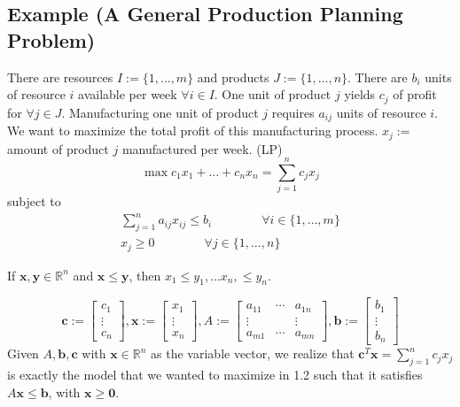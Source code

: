 \subsection{Example (A General Production Planning Problem)}
There are resources $I:=\{1,\dots,m\}$ and products $J:=\{1,\dots,n\}$. 
There are $b_i$ units of resource
$i$ available per week $\forall i\in I$. One unit of product $j$ yields $c_j$ of profit for
$\forall j\in J$. Manufacturing one unit of product $j$ requires $a_{ij}$ units of resource $i$.
We want to maximize the total profit of this manufacturing process.
$x_j :=$ amount of product $j$ manufactured per week. (LP)
\[\max c_1x_1 + \dots + c_nx_n = \sum\limits_{j=1}^n c_jx_j\]
subject to
\begin{align*}
    \sum\limits_{j=1}^n a_{ij}x_{ij}\le b_i \qquad\qquad\forall i\in\{1,\dots,m\}\\
    x_{j}\ge 0 \qquad\qquad\forall j\in\{1,\dots,n\}
\end{align*}

\begin{remark}
    If $\mathbf{x},\mathbf{y}\in\mathbb{R}^n$ and $\mathbf{x}\le \mathbf{y}$, then
    $x_1\le y_1, \dots x_n, \le y_n$.
\end{remark}

\begin{remark}
\[
\mathbf{c}:=\left[\begin{array}{c}{c_{1}} \\ {\vdots} \\ {c_{n}}\end{array}\right],
\mathbf{x}:=\left[\begin{array}{c}{x_{1}} \\ {\vdots} \\ {x_{n}}\end{array}\right],
A:=\left[\begin{array}{cccc}
    {a_{11}} & \cdots & {a_{1 n}} \\
    \vdots & & \vdots \\
     {a_{m 1}} & \cdots & {a_{m n}}
    \end{array}\right],
\mathbf{b}:=\left[\begin{array}{c}{b_{1}} \\ {\vdots} \\ {b_{n}}\end{array}\right]
\]
Given $A,\mathbf{b},\mathbf{c}$ with $\mathbf{x}\in\mathbb{R}^n$ as the variable vector, we realize that
$\mathbf{c}^T \mathbf{x}=\sum\limits_{j=1}^n c_jx_j$ is exactly the model that we wanted to maximize
in 1.2 such that it satisfies $A\mathbf{x}\le \mathbf{b}$, with $\mathbf{x}\ge \mathbf{0}$.
\end{remark}


